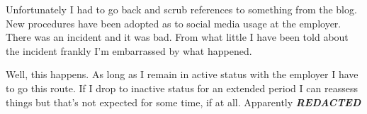 Unfortunately I had to go back and scrub references to something from
the blog. New procedures have been adopted as to social media usage at
the employer. There was an incident and it was bad. From what little I
have been told about the incident frankly I'm embarrassed by what
happened.

Well, this happens. As long as I remain in active status with the
employer I have to go this route. If I drop to inactive status for an
extended period I can reassess things but that's not expected for some
time, if at all. Apparently \textbf{\emph{REDACTED}}
